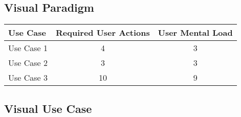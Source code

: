 \subsection*{Visual Paradigm}




\begin{tabularx}{\textwidth}{Xcc}
\textbf{Use Case} & \textbf{Required User Actions} & \textbf{User Mental Load}\\
\hline
Use Case 1                          & 4 & 3 \\
Use Case 2                          & 3 & 3 \\
Use Case 3                          & 10 & 9
\end{tabularx}

\subsection*{Visual Use Case}



